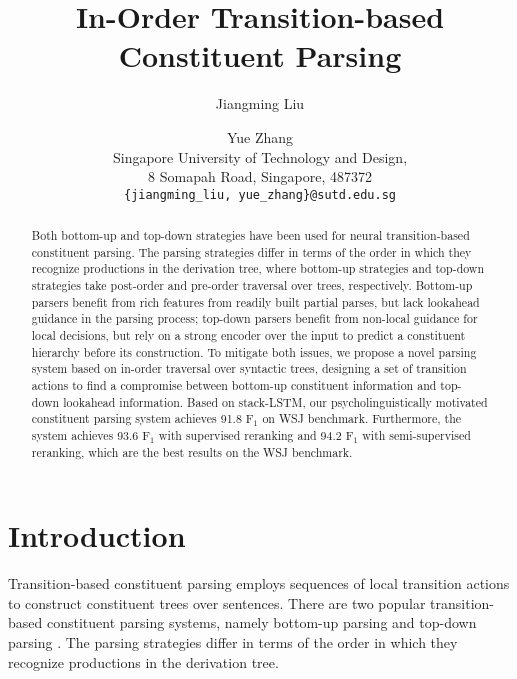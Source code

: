 \documentclass[11pt,letterpaper]{article}
\title{In-Order Transition-based Constituent Parsing}
\author{Jiangming Liu \and Yue Zhang\\
	    Singapore University of Technology and Design,\\
	    8 Somapah Road, Singapore, 487372\\
	    {\tt \{jiangming\_liu, yue\_zhang\}@sutd.edu.sg}}
\date{}
\begin{document}
\maketitle
\begin{abstract}
Both bottom-up and top-down strategies have been used for neural transition-based constituent parsing.
The parsing strategies differ in terms of the order in which they recognize productions in the derivation tree, where bottom-up strategies and top-down strategies take post-order and pre-order traversal over trees, respectively.
Bottom-up parsers benefit from rich features from readily built partial parses, but lack lookahead guidance in the parsing process; top-down parsers benefit from non-local guidance for local decisions, but rely on a strong encoder over the input to predict a constituent hierarchy before its construction.
To mitigate both issues, we propose a novel parsing system based on in-order traversal over syntactic trees, designing a set of transition actions to find a compromise between bottom-up constituent information and top-down lookahead information.
Based on stack-LSTM, our psycholinguistically motivated constituent parsing system achieves 91.8 F$_1$ on WSJ benchmark.
Furthermore, the system achieves 93.6 F$_1$ with supervised reranking and 94.2 F$_1$ with semi-supervised reranking, which are the best results on the WSJ benchmark.
\end{abstract}

\section{Introduction}
Transition-based constituent parsing employs sequences of local transition actions to construct constituent trees over sentences.
There are two popular transition-based constituent parsing systems, namely bottom-up parsing \cite{sagae:2005,zhang:2009,zhu:2013,watanabe:2015} and top-down parsing \cite{dyer:2016,kuncoro:2017}.
The parsing strategies differ in terms of the order in which they recognize productions in the derivation tree.
\end{document}
